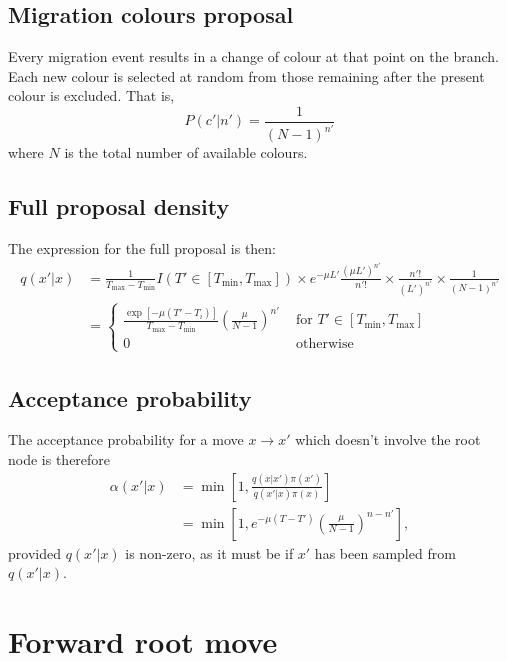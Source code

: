 \documentclass[a4paper,11pt]{article}
\begin{document}
\subsection{Migration colours proposal}

Every migration event results in a change of colour at that point on
the branch.  Each new colour is selected at random from those
remaining after the present colour is excluded. That is,
\begin{equation}
  P(c'|n') = \frac{1}{(N-1)^{n'}}
\end{equation}
where $N$ is the total number of available colours.

\subsection{Full proposal density}

The expression for the full proposal is then:
\begin{align}
  q(x'|x) &=\frac{1}{T_{\max}-T_{\min}}I(T'\in[T_{\min},T_{\max}])
  \times e^{-\mu L'}\frac{(\mu L')^{n'}}{n'!}
  \times \frac{n'!}{(L')^{n'}}
  \times \frac{1}{(N-1)^{n'}}\nonumber\\
&=\left\{\begin{array}{rl}
    \frac{\exp[-\mu(T'-T_i)]}{T_{\max}-T_{\min}}\left(\frac{\mu}{N-1}\right)^{n'} &
    \text{ for }T'\in[T_{\min},T_{\max}]\\
    0 & \text{ otherwise}
    \end{array}\right.
\end{align}

\subsection{Acceptance probability}

The acceptance probability for a move $x\rightarrow x'$ which doesn't
involve the root node is therefore
\begin{align}
  \alpha(x'|x) &=
  \min\left[1,\frac{q(x|x')\pi(x')}{q(x'|x)\pi(x)}\right]\nonumber\\
&=
\min\left[1,e^{-\mu(T-T')}\left(\frac{\mu}{N-1}\right)^{n-n'}\right],
\end{align}
provided $q(x'|x)$ is non-zero, as it must be if $x'$ has been sampled
from $q(x'|x)$.

\section{Forward root move}
\end{document}
